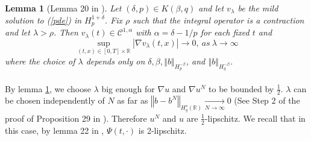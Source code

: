 \documentclass{article}[12pt]
\newtheorem{lem}[theo]{Lemma}
\newcommand{\norme}[1]{\left\Vert #1\right\Vert}
\newcommand{\R}{\mathbb{R}}
\begin{document}
        \begin{lem}[Lemma 20 in \cite{Fla-Iss-Rus-2017}]\label{lem}
            Let $(\delta,p)\in K(\beta,q)$ and let $v_\lambda$ be the mild solution to (\ref{pde}) in $H_p^{1+\delta}$. Fix $\rho$ such that the integral operator is a contraction and let $\lambda>\rho$. Then $v_\lambda(t)\in\mathcal{C}^{1,\alpha}$ with $\alpha=\delta-1/p$ for each fixed $t$ and 
            \begin{equation}
            \underset{(t,x)\in[0,T]\times\R}{\sup} |\nabla v_\lambda(t,x)| \rightarrow 0,\ as\ \lambda \rightarrow \infty
            \end{equation}
            where the choice of $\lambda$ depends only on $\delta,\beta,\norme{b}_{H_p^{-\beta}}$, and $\norme{b}_{H_q^{-\beta}}$.
        \end{lem}
    \paragraph{}  
    By lemma \ref{lem}, we choose $\lambda$ big enough for $\nabla u$ and $\nabla u^N$ to be bounded by $\frac{1}{2}$. $\lambda$ can be chosen independently of $N$ as far as $\norme{b - b^N}_{H_q^s(\R)} \underset{N\rightarrow\infty}{\longrightarrow} 0$ (See Step 2 of the proof of Proposition 29 in \cite{Fla-Iss-Rus-2017}). Therefore $u^N$ and $u$ are $\frac{1}{2}$-lipschitz. We recall that in this case, by lemma 22 in \cite{Fla-Iss-Rus-2017}, $\Psi(t,\cdot)$ is 2-lipschitz.
    
    
        
\end{document}
